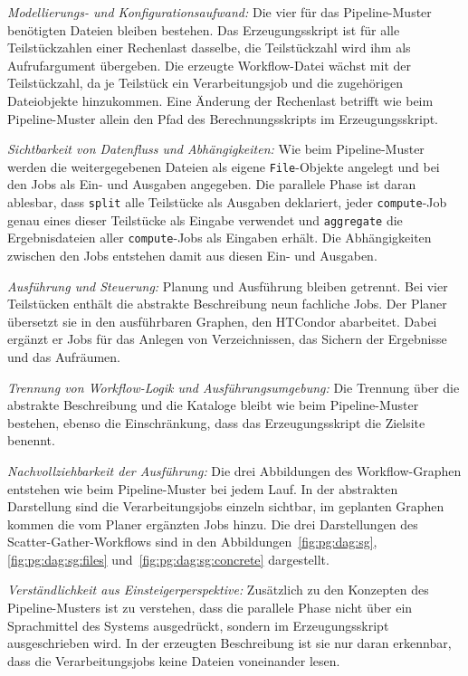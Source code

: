 \emph{Modellierungs- und Konfigurationsaufwand:} Die vier für das
Pipeline-Muster benötigten Dateien bleiben bestehen. Das
Erzeugungsskript ist für alle Teilstückzahlen einer Rechenlast
dasselbe, die Teilstückzahl wird ihm als Aufrufargument übergeben.
Die erzeugte Workflow-Datei wächst mit der Teilstückzahl, da je
Teilstück ein Verarbeitungsjob und die zugehörigen Dateiobjekte
hinzukommen. Eine Änderung der Rechenlast betrifft wie beim
Pipeline-Muster allein den Pfad des Berechnungsskripts im
Erzeugungsskript.

\emph{Sichtbarkeit von Datenfluss und Abhängigkeiten:} Wie beim
Pipeline-Muster werden die weitergegebenen Dateien als eigene
\texttt{File}-Objekte angelegt und bei den Jobs als Ein- und
Ausgaben angegeben. Die parallele Phase ist daran ablesbar, dass
\texttt{split} alle Teilstücke als Ausgaben deklariert, jeder
\texttt{compute}-Job genau eines dieser Teilstücke als Eingabe
verwendet und \texttt{aggregate} die Ergebnisdateien aller
\texttt{compute}-Jobs als Eingaben erhält. Die Abhängigkeiten
zwischen den Jobs entstehen damit aus diesen Ein- und Ausgaben.

\emph{Ausführung und Steuerung:} Planung und Ausführung bleiben
getrennt. Bei vier Teilstücken enthält die abstrakte Beschreibung
neun fachliche Jobs. Der Planer übersetzt sie in den ausführbaren Graphen, den HTCondor abarbeitet. Dabei ergänzt er Jobs für das Anlegen von Verzeichnissen, das Sichern der Ergebnisse und das Aufräumen.

\emph{Trennung von Workflow-Logik und Ausführungsumgebung:} Die
Trennung über die abstrakte Beschreibung und die Kataloge bleibt wie
beim Pipeline-Muster bestehen, ebenso die Einschränkung, dass das
Erzeugungsskript die Zielsite benennt.


\emph{Nachvollziehbarkeit der Ausführung:} Die drei Abbildungen des
Workflow-Graphen entstehen wie beim Pipeline-Muster bei jedem Lauf.
In der abstrakten Darstellung sind die Verarbeitungsjobs einzeln
sichtbar, im geplanten Graphen kommen die vom Planer ergänzten Jobs
hinzu. Die drei Darstellungen des Scatter-Gather-Workflows sind in
den Abbildungen~\ref{fig:pg:dag:sg}, \ref{fig:pg:dag:sg:files}
und~\ref{fig:pg:dag:sg:concrete} dargestellt.

\emph{Verständlichkeit aus Einsteigerperspektive:} Zusätzlich zu den
Konzepten des Pipeline-Musters ist zu verstehen, dass die parallele
Phase nicht über ein Sprachmittel des Systems ausgedrückt, sondern
im Erzeugungsskript ausgeschrieben wird. In der erzeugten
Beschreibung ist sie nur daran erkennbar, dass die
Verarbeitungsjobs keine Dateien voneinander lesen.

